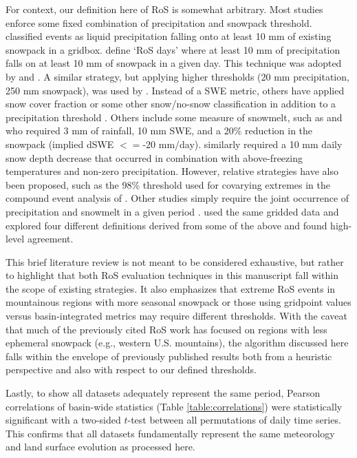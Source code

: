 \documentclass[nhess, manuscript]{copernicus}
\begin{document}
For context, our definition here of RoS is somewhat arbitrary. Most studies enforce some fixed combination of precipitation and snowpack threshold. \citet{ye2008winter} classified events as liquid precipitation falling onto at least 10 mm of existing snowpack in a gridbox. \citet{musselman2018projected} define `RoS days' where at least 10 mm of precipitation falls on at least 10 mm of snowpack in a given day. This technique was adopted by \citet{lopez2021changes} and \citet{maina2023diverging}. A similar strategy, but applying higher thresholds (20 mm precipitation, 250 mm snowpack), was used by \citet{wurzer2016influence}. Instead of a SWE metric, others have applied snow cover fraction or some other snow/no-snow classification in addition to a precipitation threshold \citep{mazurkiewicz2008assessing,pradhanang2013rain,cohen2015trends}. Others include some measure of snowmelt, such as \citet{freudiger2014large} and \citet{li2019the} who required 3 mm of rainfall, 10 mm SWE, and a 20\% reduction in the snowpack (implied dSWE $<=$-20 mm/day). \citet{suriano2022north} similarly required a 10 mm daily snow depth decrease that occurred in combination with above-freezing temperatures and non-zero precipitation. However, relative strategies have also been proposed, such as the 98\% threshold used for covarying extremes in the compound event analysis of \citet{poschlod2020climate}. Other studies simply require the joint occurrence of precipitation and snowmelt in a given period \citep{mccabe2007rain,surfleet2013variability,collins2014annual,guan2016hydrometeorological,jeong2018rain}. \citet{wachowicz2020rain} used the same gridded data and explored four different definitions derived from some of the above and found high-level agreement.

This brief literature review is not meant to be considered exhaustive, but rather to highlight that both RoS evaluation techniques in this manuscript fall within the scope of existing strategies. It also emphasizes that extreme RoS events in mountainous regions with more seasonal snowpack or those using gridpoint values versus basin-integrated metrics may require different thresholds. With the caveat that much of the previously cited RoS work has focused on regions with less ephemeral snowpack (e.g., western U.S. mountains), the algorithm discussed here falls within the envelope of previously published results both from a heuristic perspective and also with respect to our defined thresholds.

Lastly, to show all datasets adequately represent the same period, Pearson correlations of basin-wide statistics (Table \ref{table:correlations}) were statistically significant with a two-sided $t$-test between all permutations of daily time series. This confirms that all datasets fundamentally represent the same meteorology and land surface evolution as processed here.
\end{document}
